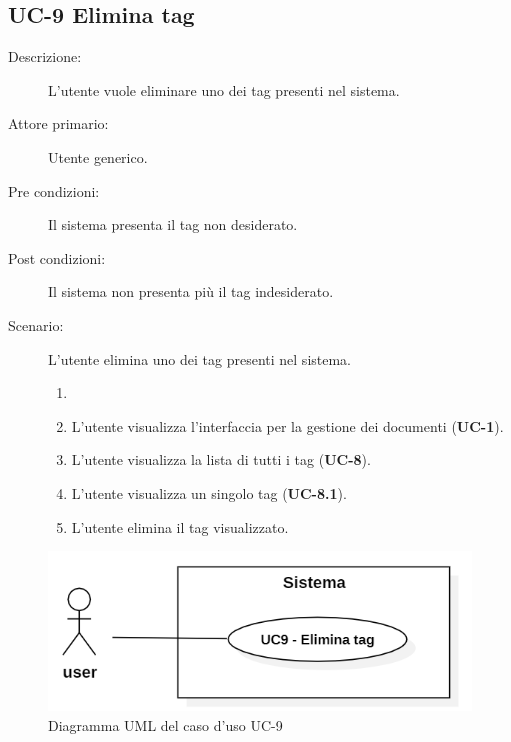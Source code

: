 \subsection{UC-9 Elimina tag}
\begin{description}
    \item[Descrizione:] L'utente vuole eliminare uno dei tag presenti nel sistema.
    \item[Attore primario:] Utente generico.
    \item[Pre condizioni:] Il sistema presenta il tag non desiderato.
    \item[Post condizioni:] Il sistema non presenta più il tag indesiderato.
    \item[Scenario:] L'utente elimina uno dei tag presenti nel sistema.
    \begin{enumerate}
        \item[] 
        \item L’utente visualizza l'interfaccia per la gestione dei documenti (\textbf{UC-1}).
        \item L’utente visualizza la lista di tutti i tag (\textbf{UC-8}).
        \item L'utente visualizza un singolo tag (\textbf{UC-8.1}).
        \item L'utente elimina il tag visualizzato.
    \end{enumerate}
\end{description}

\begin{figure}[H]
    \centering
    \includegraphics[width=0.8\linewidth]{UC9.PNG}
    \caption{Diagramma UML del caso d'uso UC-9}
    \label{fig:UC9}
\end{figure}


